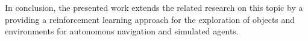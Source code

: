     In conclusion, the presented work extends the related research on this topic by a providing a reinforcement learning approach for the exploration of objects and environments for autonomous navigation and simulated agents.
    
    
    
    


    
    

